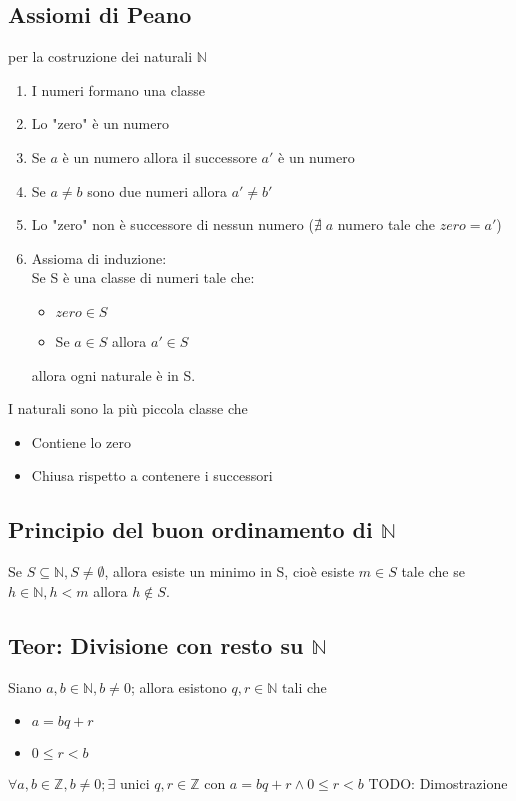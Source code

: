 \subsection{Assiomi di Peano} per la costruzione dei naturali \(\mathbb{N}\)
\begin{enumerate}
    \item I numeri formano una classe
    \item Lo "zero" è un numero
    \item Se \(a\) è un numero allora il successore \(a'\) è un numero
    \item Se \(a\neq b\) sono due numeri allora \(a'\neq b'\)
    \item Lo "zero" non è successore di nessun numero (\(\nexists \; a\) numero tale che \(zero=a'\))
    \item Assioma di induzione:
    \\Se S è una classe di numeri tale che:
    \begin{itemize}
        \item \(zero\in S\)
        \item Se \(a\in S\) allora \(a'\in S\)
    \end{itemize}
    allora ogni naturale è in S.
\end{enumerate}
I naturali sono la più piccola classe che 
\begin{itemize}
    \item Contiene lo zero
    \item Chiusa rispetto a contenere i successori
\end{itemize}

\subsection{Principio del buon ordinamento di \(\mathbb{N}\)} 
Se \(S\subseteq \mathbb{N}, S\neq\emptyset\), allora esiste un minimo in S, cioè esiste \(m\in S\) tale che se \(h\in\mathbb{N}, h<m\) allora \(h\notin S\).

\subsection{Teor: Divisione con resto su \(\mathbb{N}\)} 
Siano \(a,b\in\mathbb{N}, b\neq 0\); allora esistono \(q, r\in\mathbb{N}\) tali che
\begin{itemize}
    \item \(a=bq+r\)
    \item \(0\leq r<b\)
\end{itemize}
\(\forall a,b\in\mathbb{Z}, b\neq 0; \exists\) unici \(q, r\in\mathbb{Z}\) con \(a=bq+r \land 0\leq r<b\)
TODO: Dimostrazione

